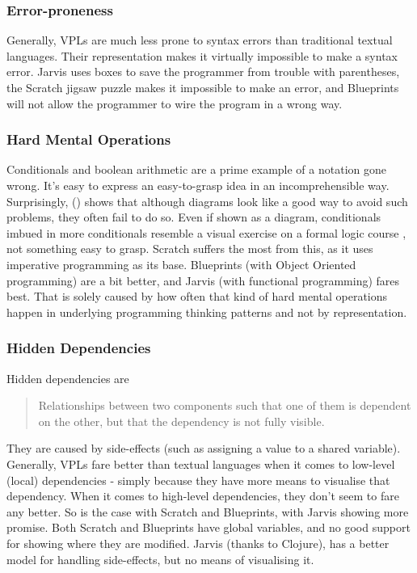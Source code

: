 \documentclass[11pt]{scrartcl}
\begin{document}
\subsubsection{Error-proneness}
Generally, VPLs are much less prone to syntax errors than traditional textual
languages.
Their representation makes it virtually impossible to make a syntax error.
Jarvis uses boxes to save the programmer from trouble with parentheses, the
Scratch jigsaw puzzle makes it impossible to make an error, and Blueprints will
not allow the programmer to wire the program in a wrong way.

\subsubsection{Hard Mental Operations}
Conditionals and boolean arithmetic are a prime example of a notation gone
wrong.
It’s easy to express an easy-to-grasp idea in an incomprehensible way.
Surprisingly, (\cite{Green96UsabilityAnalysis}) shows that although diagrams look
like a good way to avoid such problems, they often fail to do so.
Even if shown as a diagram, conditionals imbued in more conditionals resemble a
visual exercise on a formal logic course , not something easy to grasp.
Scratch suffers the most from this, as it uses imperative programming as its
base.
Blueprints (with Object Oriented programming) are a bit better, and Jarvis (with
functional programming) fares best.
That is solely caused by how often that kind of hard mental operations happen in
underlying programming thinking patterns and not by representation.

\subsubsection{Hidden Dependencies}
Hidden dependencies are
\blockquote[{\cite{Green96UsabilityAnalysis}}]{Relationships between two
  components such that one of them is dependent on the other, but that the
  dependency is not fully visible.}

They are caused by side-effects (such as assigning a value to a shared
variable).
Generally, VPLs fare better than textual languages when it comes to low-level
(local) dependencies - simply because they have more means to visualise that
dependency.
When it comes to high-level dependencies, they don’t seem to fare any better.
So is the case with Scratch and Blueprints, with Jarvis showing more promise.
Both Scratch and Blueprints have global variables, and no good support for
showing where they are modified.
Jarvis (thanks to Clojure), has a better model for handling side-effects, but no
means of visualising it.
\end{document}
